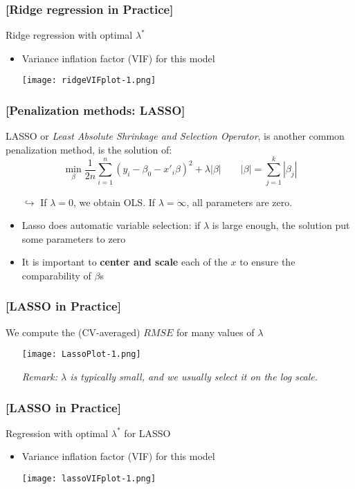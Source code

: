 \documentclass[xcolor=x11names,compress]{beamer}
\renewcommand{\(}{\begin{columns}}
\renewcommand{\)}{\end{columns}}
\newcommand{\<}[1]{\begin{column}{#1}}
\renewcommand{\>}{\end{column}}
\begin{document}
\begin{frame} %
\frametitle{\textcolor{brique}{[Ridge regression in Practice]}}
Ridge regression with  optimal $\lambda^*$
\pause
\begin{itemize}[<+->]
\item Variance inflation factor (VIF)  for this model
\item[] \texttt{[image: ridgeVIFplot-1.png]}
\end{itemize}
\end{frame}


\begin{frame} %
\frametitle{\textcolor{brique}{[Penalization methods: LASSO]}}
LASSO or \textit{Least Absolute Shrinkage and Selection Operator}, is another common penalization method,
 is  the solution of:
$$
\min_{\beta} \frac{1}{2n}
\sum_{i=1}^{n}{ \left( y_i - \beta_0 - x'_i\beta\right)^{2} } +
\lambda |\beta|
\qquad
|\beta| = \sum_{j=1}^k |\beta_j|
$$
\pause
\begin{itemize}[<+->]
\item[$\hookrightarrow$] If $\lambda  = 0$, we obtain OLS. If $\lambda = \infty$, all
  parameters are zero.
\item Lasso does automatic variable selection: if $\lambda$ is large enough, the solution put some parameters to zero
\item It is important to \textbf{center and scale}  each of the $x$ to ensure the comparability of $\beta$s
\end{itemize}
\end{frame}

\begin{frame} %
\frametitle{\textcolor{brique}{[LASSO in Practice]}}
We compute the (CV-averaged) $RMSE$ for many values of $\lambda$
\pause
\begin{itemize}[<+->]
\item[]  \texttt{[image: LassoPlot-1.png]}
\item[]\textit{Remark: $\lambda$ is typically small, and we usually select it on the log scale.}
\end{itemize}
\end{frame}

\begin{frame} %
\frametitle{\textcolor{brique}{[LASSO in Practice]}}
Regression with  optimal $\lambda^*$ for LASSO
\pause
\begin{itemize}[<+->]
\item Variance inflation factor (VIF)  for this model
\item[] \texttt{[image: lassoVIFplot-1.png]}
\end{itemize}
\end{frame}
\end{document}
